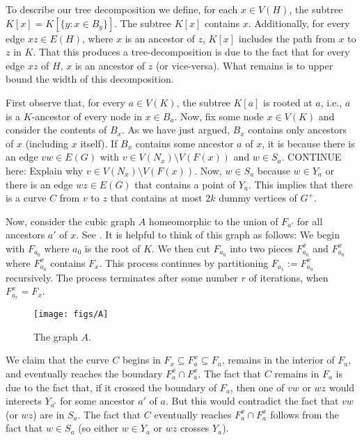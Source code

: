 \documentclass{patmorin}
\begin{document}
To describe our tree decomposition we define, for each $x\in V(H)$, the subtree $K[x]=K[\{y:x\in B_y\}]$.  The subtree $K[x]$ contains $x$.  Additionally, for every edge $xz\in E(H)$, where $x$ is an ancestor of $z$, $K[x]$ includes the path from $x$ to $z$ in $K$.  That this produces a tree-decomposition is due to the fact that for every edge $xz$ of $H$, $x$ is an ancestor of $z$ (or vice-versa).  What remains is to upper bound the width of this decomposition.

First observe that, for every $a\in V(K)$, the subtree $K[a]$ is rooted at $a$, i.e., $a$ is a $K$-ancestor of every node in $x\in B_a$.  Now, fix some node $x\in V(K)$ and consider the contents of $B_x$.  As we have just argued, $B_x$ contains only ancestors of $x$ (including $x$ itself). If $B_x$ contains some ancestor $a$ of $x$, it is because there is an edge $vw\in E(G)$ with $v\in V(N_x)\setminus V(F(x))$ and $w\in S_a$. {\color{red} CONTINUE here: Explain why $v\in V(N_x)\setminus V(F(x))$.}  Now, $w\in S_a$ because $w\in Y_a$ or there is an edge $wz\in E(G)$ that contains a point of $Y_a$.  This implies that there is a curve $C$ from $v$ to $z$ that contains at most $2k$ dummy  vertices of $G^+$.

Now, consider the cubic graph $A$ homeomorphic to the union of $F_{a'}$ for all ancestors $a'$ of $x$. See .  It is helpful to think of this graph as follows:  We begin with $F_{a_0}$ where $a_0$ is the root of $K$.  We then cut $F_{a_0}$ into two pieces $F^{\bar{x}}_{a_0}$ and $F^x_{a_0}$ where $F^x_{a_0}$ contains $F_x$.  This process continues by partitioning $F_{a_1}:=F^x_{a_0}$ recursively.  The process terminates after some number $r$ of iterations, when $F^x_{a_r}=F_x$.

\begin{figure}
  \begin{center}
    \texttt{[image: figs/A]}
  \end{center}
  \caption{The graph $A$.}
\end{figure}

We claim that the curve $C$ begins in $F_x\subseteq F^x_a\subseteq F_a$, remains in the interior of $F_a$, and eventually reaches the boundary $F^{\bar{x}}_a\cap F^x_a$.  The fact that $C$ remains in $F_a$ is due to the fact that, if it crossed the boundary of $F_a$, then one of $vw$ or $wz$ would interects $Y_{a'}$ for some ancestor $a'$ of $a$.  But this would contradict the fact that $vw$ (or $wz$) are in $S_a$. The fact that $C$ eventually reaches $F^{\bar{x}}_a\cap F^x_a$ follows from the fact that $w\in S_a$ (so either $w\in Y_a$ or $wz$ crosses $Y_a$).
\end{document}
